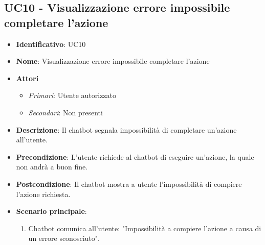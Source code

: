 \subsection{UC10 - Visualizzazione errore impossibile completare l'azione}
\begin{itemize}
	\item \textbf{Identificativo}: UC10
	\item \textbf{Nome}:  Visualizzazione errore impossibile completare l'azione
	\item \textbf{Attori}
	\begin{itemize} 
		\item \textit{Primari}: Utente autorizzato
		\item \textit{Secondari}: Non presenti
	\end{itemize}
	\item \textbf{Descrizione}: Il chatbot segnala impossibilità di completare un'azione all'utente.
	\item \textbf{Precondizione}: L'utente richiede al chatbot di eseguire un'azione, la quale non andrà a buon fine.
	\item \textbf{Postcondizione}: Il chatbot mostra a utente l'impossibilità di compiere l'azione richiesta.
	\item \textbf{Scenario principale}: \begin{enumerate}
		\item Chatbot comunica all'utente: "Impossibilità a compiere l'azione a causa di un errore sconosciuto".
	\end{enumerate}
\end{itemize}